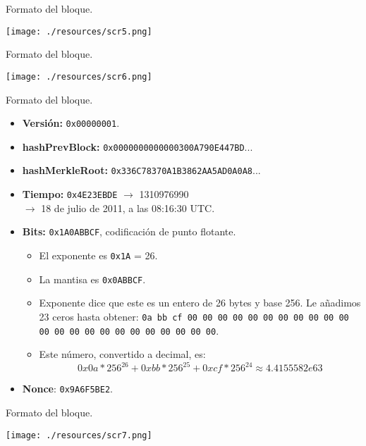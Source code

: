 \documentclass[10pt, xcolor=table]{beamer}
\begin{document}
\begin{frame}{Formato del bloque. }
\begin{center}
\hspace{1cm}
	\texttt{[image: ./resources/scr5.png]}
\end{center}	
\end{frame}

\begin{frame}{Formato del bloque. }
\begin{center}
\hspace{1cm}
	\texttt{[image: ./resources/scr6.png]}
\end{center}	
\end{frame}

\begin{frame}{Formato del bloque. }
\begin{itemize}
\item
  \textbf{Versión:} \texttt{0x00000001}.
\item
  \textbf{hashPrevBlock:} \texttt{0x0000000000000300A790E447BD}...
\item
	\textbf{hashMerkleRoot:} \texttt{0x336C78370A1B3862AA5AD0A0A8}...
\item
	\textbf{Tiempo:} \texttt{0x4E23EBDE} $\longrightarrow$ 1310976990 \\$\longrightarrow$ 18 de julio de 2011, a las 08:16:30 UTC.
\item
	\textbf{Bits:} \texttt{0x1A0ABBCF}, codificación de punto flotante.
\begin{itemize}
	\item
		El exponente es \texttt{0x1A} = 26.
	\item
		La mantisa es \texttt{0x0ABBCF}.
	\item
		Exponente dice que este es un entero de 26 bytes y base 256. Le añadimos 23 ceros hasta obtener: \texttt{0a bb cf 00 00   00 00 00 00 00    00 00 00 00 00    00 00 00 00 00    00 00 00 00    00 00}.
	\item
		Este número, convertido a decimal, es:$$0x0a * 256^{26} + 0xbb * 256^{25} + 0xcf*256^{24} \approx  4.4155582e63$$
	\end{itemize}
\item
	\textbf{Nonce}: \texttt{0x9A6F5BE2}.	
\end{itemize}
\end{frame}

\begin{frame}{Formato del bloque. }
\begin{center}
\hspace{1cm}
	\texttt{[image: ./resources/scr7.png]}
\end{center}	
\end{frame}
\end{document}
